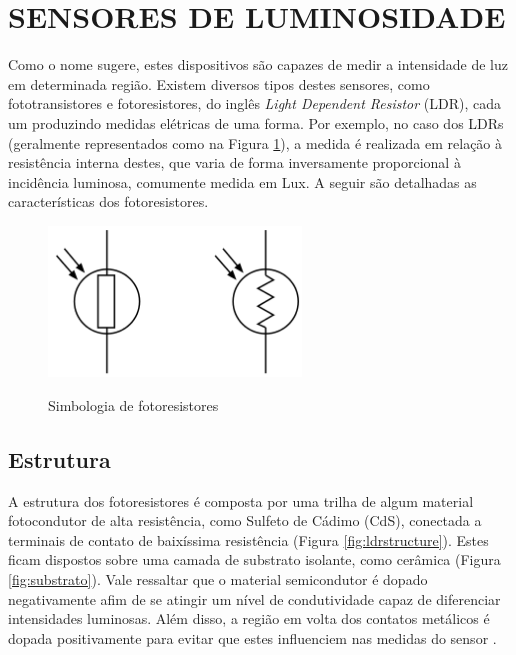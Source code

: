\documentclass[oneside,openright,12pt]{ufsm_2015} %
\begin{document}
\section{SENSORES DE LUMINOSIDADE}
Como o nome sugere, estes dispositivos são capazes de medir a intensidade de luz em determinada região. Existem diversos tipos destes sensores, como fototransistores e fotoresistores, do inglês \textit{Light Dependent Resistor} (LDR), cada um produzindo medidas elétricas de uma forma. Por exemplo, no caso dos LDRs (geralmente representados como na Figura \ref{fig:ldr-simbolo}), a medida é realizada em relação à resistência interna destes, que varia de forma inversamente proporcional à incidência luminosa, comumente medida em Lux. A seguir são detalhadas as características dos fotoresistores.
\begin{figure}[ht]
    \caption{\label{exepretex} Simbologia de fotoresistores}
    \centering
    \includegraphics[width=0.6\textwidth]{figuras/ldrsymbol.png}
    \vspace{\baselineskip} %
        \label{fig:ldr-simbolo}
\end{figure}


\subsection{Estrutura}
A estrutura dos fotoresistores é composta por uma trilha de algum material fotocondutor de alta resistência, como Sulfeto de Cádimo (CdS), conectada a terminais de contato de baixíssima resistência (Figura \ref{fig:ldrstructure}). Estes ficam dispostos sobre uma camada de substrato isolante, como cerâmica (Figura \ref{fig:substrato}). Vale ressaltar que o material semicondutor é dopado negativamente afim de se atingir um nível de condutividade capaz de diferenciar intensidades luminosas. Além disso, a região em volta dos contatos metálicos é dopada positivamente para evitar que estes influenciem nas medidas do sensor \cite{LightDep25:online}.
\end{document}
